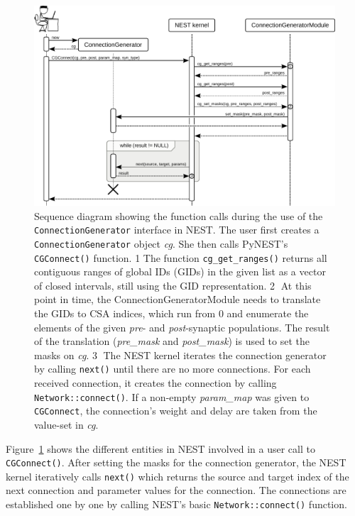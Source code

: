 \documentclass{frontiersSCNS} %
\newcommand{\INLINEFIGS}{} %
\newcommand{\Figure}[2]{Figure~\ref{#2}}
\newcommand{\Figure}[2]{Figure~#1}
\begin{document}
\ifdefined\INLINEFIGS
\begin{figure}[ht]
\centering
\includegraphics[scale=.8]{figures/sequence_diagram_nest.pdf}
\caption{Sequence diagram showing the function calls during the use of
  the \texttt{ConnectionGenerator} interface in NEST. The user first creates a
  \texttt{ConnectionGenerator} object \emph{cg}. She then calls
  PyNEST's \texttt{CGConnect()} function. \textcircled{\footnotesize
    1} The function \texttt{cg\_get\_ranges()} returns all contiguous
  ranges of global IDs (GIDs) in the given list as a vector of closed
  intervals, still using the GID representation.
  \textcircled{\footnotesize 2} At this point in time, the
  ConnectionGeneratorModule needs to translate the GIDs to CSA
  indices, which run from 0 and enumerate the elements of the given
  \emph{pre}- and \emph{post}-synaptic populations. The result of the
  translation (\emph{pre\_mask} and \emph{post\_mask}) is used to set
  the masks on \emph{cg}. \textcircled{\footnotesize 3} The NEST
  kernel iterates the connection generator by calling \texttt{next()}
  until there are no more connections. For each received connection,
  it creates the connection by calling \texttt{Network::connect()}. If
  a non-empty \emph{param\_map} was given to \texttt{CGConnect}, the
  connection's weight and delay are taken from the value-set in
  \emph{cg}.}\label{fig:sequence_diagram_nest}
\end{figure}
\fi

\Figure{3}{fig:sequence_diagram_nest} shows the different entities in
NEST involved in a user call to \verb|CGConnect()|. After setting the
masks for the connection generator, the NEST kernel iteratively calls
\verb|next()| which returns the source and target index of the next
connection and parameter values for the connection. The connections
are established one by one by calling NEST's basic
\verb|Network::connect()| function.
\end{document}
